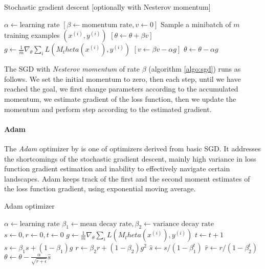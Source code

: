 \begin{algorithm} \label{algo:sgd}
\caption{Stochastic gradient descent [optionally with Nesterov momentum]}
\begin{algorithmic}
\STATE $\alpha \gets \text{learning rate}$
\STATE $[\beta \gets \text{momentum rate}, v \gets 0]$
\REPEAT
\STATE Sample a minibatch of $m$ training examples $(x^{(i)}, y^{(i)})$
\STATE $[\theta \gets \theta + \beta v]$
\STATE $g \gets \frac{1}{m} \nabla_\theta \sum_i L(M_theta(x^{(i)}),y^{(i)})$
\STATE $[v \gets \beta v - \alpha g]$
\STATE $\theta \gets \theta - \alpha g$
\end{algorithmic}
\end{algorithm}

\noindent The SGD with \emph{Nesterov momentum} of rate $\beta$ (algorithm \ref{algo:sgd}) runs as follows. We set the initial momentum to zero, then each step, until we have reached the goal, we first change parameters according to the accumulated momentum, we estimate gradient of the loss function, then we update the momentum and perform step according to the estimated gradient.

\paragraph{Adam}

The \emph{Adam} optimizer by \cite{DBLP:journals/corr/KingmaB14} is one of optimizers derived from basic SGD. It addresses the shortcomings of the stochastic gradient descent, mainly high variance in loss function gradient estimation and inability to effectively navigate certain landscapes. Adam keeps track of the first and the second moment estimates of the loss function gradient, using exponential moving average.

\begin{algorithm}  \label{algo:adam}
\caption{Adam optimizer}
\begin{algorithmic}
\STATE $\alpha \gets \text{learning rate}$
\STATE $\beta_1 \gets \text{mean decay rate}, \beta_2 \gets \text{variance decay rate}$
\STATE $s \gets 0, r \gets 0, t \gets 0$
\REPEAT
\STATE $g \gets \frac{1}{m} \nabla_\theta \sum_i L(M_theta(x^{(i)}),y^{(i)})$
\STATE $t \gets t + 1$
\STATE $s \gets \beta_1 s + (1 - \beta_1)g$
\STATE $r \gets \beta_2 r + (1 - \beta_2)g^2$
\STATE $\hat{s} \gets s / (1 - \beta_1^t)$
\STATE $\hat{r} \gets r / (1 - \beta_2^t)$
\STATE $\theta \gets \theta - \frac{\alpha}{\sqrt{\hat{r} + \epsilon}} \hat{s}$
\end{algorithmic}
\end{algorithm}

